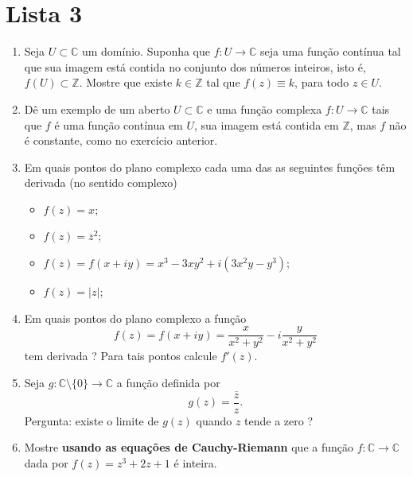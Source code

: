 \chapter*{Lista 3}



\begin{enumerate}[leftmargin=*]


	\item Seja $U\subset \mathbb{C}$ um domínio. Suponha que $f:U\to\mathbb{C}$
	seja uma função contínua tal que sua imagem está contida no conjunto dos números
	inteiros, isto é, $f(U)\subset\mathbb{Z}$. Mostre que existe $k\in\mathbb{Z}$ 
	tal que $f(z)\equiv k$, para todo $z\in U$.
	
	\item Dê um exemplo de um aberto $U\subset \mathbb{C}$ e uma 
	função complexa $f:U\to\mathbb{C}$ tais que
	$f$ é uma função contínua em $U$, sua imagem está contida em $\mathbb{Z}$,
	mas $f$ não é constante, como no exercício anterior.

	\item Em quais pontos do plano complexo cada uma das as seguintes funções  
			têm derivada (no sentido complexo)
			
			\begin{itemize}
				\item $f(z) = x$;
				\item $f(z)	= \overline{z}^2$;
				\item $f(z) = f(x + iy) = x^3-3xy^2+i(3x^2y -y^3)$;
				\item $f(z)	= |z|$;
			\end{itemize}
		
	\item Em quais pontos do plano complexo a função 
			$$
			f(z)=f(x+iy) = \frac{x}{x^2+y^2}- i\frac{y}{x^2+y^2}
			$$
			tem derivada ? Para tais pontos calcule $f'(z)$.




			
	\item Seja $g:\mathbb{C}\setminus\{0\}\to \mathbb{C}$ a função definida por 
	$$
	  g(z)=\frac{\overline{z}}{z}.
	$$
	Pergunta: existe o limite de $g(z)$ quando $z$ tende a zero ?
	

	
	
	\item Mostre {\bf usando as equações de Cauchy-Riemann} que a função $f:\mathbb{C}\to\mathbb{C}$ dada por $f(z)=z^3+2z+1$ é inteira.
	

\end{enumerate}

